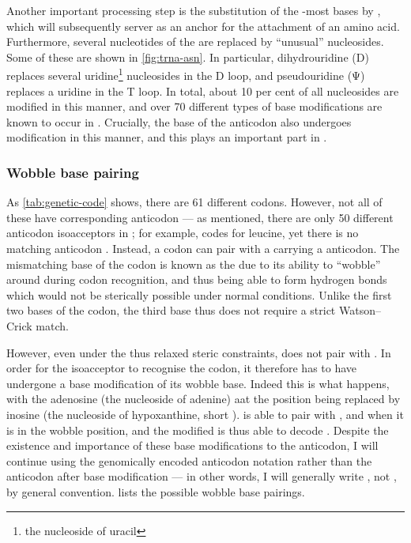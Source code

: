 Another important processing step is the substitution of the \threep-most bases
by , which will subsequently server as an anchor for the
attachment of an amino acid. Furthermore, several nucleotides of the \trna are
replaced by “unusual” nucleosides. Some of these are shown in
\cref{fig:trna-asn}. In particular, dihydrouridine (\seq D) replaces several
uridine\footnote{the nucleoside of uracil} nucleosides in the D loop, and
pseudouridine (\seq Ψ) replaces a uridine in the T loop. In total, about
\num{10} per cent of all nucleosides are modified in this manner, and over
\num{70} different types of base modifications are known to occur in \trna
\citep{Limbach:1994,Dalluge:1997,Alberts:2002}. Crucially, the \fivep base of
the anticodon also undergoes modification in this manner, and this plays an
important part in .

\subsubsection{Wobble base pairing}

As \cref{tab:genetic-code} shows, there are \num{61} different codons. However,
not all of these have corresponding anticodon \trna[s] --- as mentioned, there
are only \num{50} different anticodon isoacceptors in \mmu; for example,
 codes for leucine, yet there is no matching 
anticodon \trna. Instead, a  codon can pair with a \trna carrying a
 anticodon. The mismatching \threep base of the codon is known as
the  due to its ability to “wobble” around during codon
recognition, and thus being able to form hydrogen bonds which would not be
sterically possible under normal conditions. Unlike the first two bases of the
codon, the third base thus does not require a strict Watson--Crick match.

However, even under the thus relaxed steric constraints, \nA does not pair with
\nC. In order for the  isoacceptor \trna[s] to recognise the
 codon, it therefore has to have undergone a base modification of its
wobble base. Indeed this is what happens, with the adenosine (the nucleoside of
adenine) aat the \fivep position being replaced by inosine (the nucleoside of
hypoxanthine, short \nI). \nI is able to pair with \nA, \nC and \nU when it is
in the wobble position, and the modified  is thus able to decode
 \citep{Crick:1966,Murphy:2004}. Despite the existence and importance
of these base modifications to the anticodon, I will continue using the
genomically encoded anticodon notation rather than the anticodon after base
modification --- in other words, I will generally write , not
, by general convention.  lists the possible
wobble base pairings.


